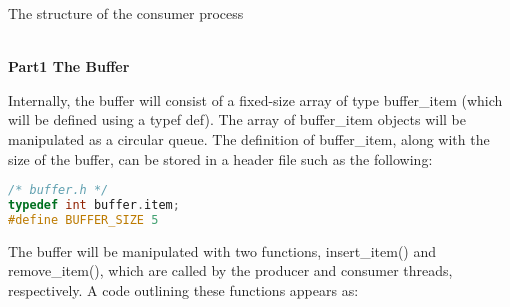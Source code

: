 \documentclass[12pt,a4paper]{article}
\begin{document}
\begin{algorithm}[H]
  \SetAlgoLined
  
  \BlankLine
  

  \caption{The structure of the consumer process}
  \end{algorithm}

~\\


 \textbf{Part1 The Buffer }

Internally, the buffer will consist of a fixed-size array of type buffer\_item (which will be defined using a typef def). The array of buffer\_item objects will be manipulated as a circular queue. The definition of buffer\_item, along with the size of the buffer, can be stored in a header file such as the following:


\begin{lstlisting}[language=C++]
/* buffer.h */ 
typedef int buffer.item; 
#define BUFFER_SIZE 5

\end{lstlisting}

The buffer will be manipulated with two functions, insert\_item() and remove\_item(), which are called by the producer and consumer threads, respectively. A code outlining these functions appears as:
\end{document}
